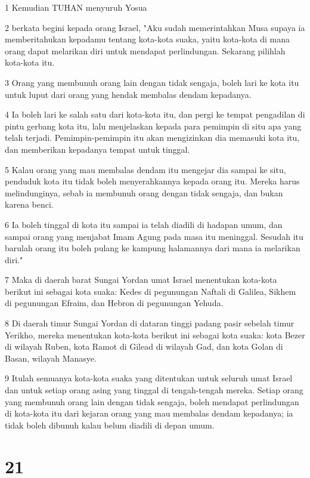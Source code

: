 \par 1 Kemudian TUHAN menyuruh Yosua
\par 2 berkata begini kepada orang Israel, "Aku sudah memerintahkan Musa supaya ia memberitahukan kepadamu tentang kota-kota suaka, yaitu kota-kota di mana orang dapat melarikan diri untuk mendapat perlindungan. Sekarang pilihlah kota-kota itu.
\par 3 Orang yang membunuh orang lain dengan tidak sengaja, boleh lari ke kota itu untuk luput dari orang yang hendak membalas dendam kepadanya.
\par 4 Ia boleh lari ke salah satu dari kota-kota itu, dan pergi ke tempat pengadilan di pintu gerbang kota itu, lalu menjelaskan kepada para pemimpin di situ apa yang telah terjadi. Pemimpin-pemimpin itu akan mengizinkan dia memasuki kota itu, dan memberikan kepadanya tempat untuk tinggal.
\par 5 Kalau orang yang mau membalas dendam itu mengejar dia sampai ke situ, penduduk kota itu tidak boleh menyerahkannya kepada orang itu. Mereka harus melindunginya, sebab ia membunuh orang dengan tidak sengaja, dan bukan karena benci.
\par 6 Ia boleh tinggal di kota itu sampai ia telah diadili di hadapan umum, dan sampai orang yang menjabat Imam Agung pada masa itu meninggal. Sesudah itu barulah orang itu boleh pulang ke kampung halamannya dari mana ia melarikan diri."
\par 7 Maka di daerah barat Sungai Yordan umat Israel menentukan kota-kota berikut ini sebagai kota suaka: Kedes di pegunungan Naftali di Galilea, Sikhem di pegunungan Efraim, dan Hebron di pegunungan Yehuda.
\par 8 Di daerah timur Sungai Yordan di dataran tinggi padang pasir sebelah timur Yerikho, mereka menentukan kota-kota berikut ini sebagai kota suaka: kota Bezer di wilayah Ruben, kota Ramot di Gilead di wilayah Gad, dan kota Golan di Basan, wilayah Manasye.
\par 9 Itulah semuanya kota-kota suaka yang ditentukan untuk seluruh umat Israel dan untuk setiap orang asing yang tinggal di tengah-tengah mereka. Setiap orang yang membunuh orang lain dengan tidak sengaja, boleh mendapat perlindungan di kota-kota itu dari kejaran orang yang mau membalas dendam kepadanya; ia tidak boleh dibunuh kalau belum diadili di depan umum.

\chapter{21}

